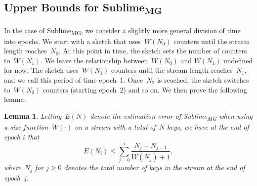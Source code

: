 \documentclass[sigconf]{acmart}
\newtheorem{lemma}[theorem]{Lemma}
\newcommand{\sketch}{Sublime}
\newcommand{\sketchmg}{\sketch\textsubscript{MG}\xspace}
\begin{document}
\subsection{Upper Bounds for \sketchmg}\label{sec:upper_bounds_mg_normal}
In the case of \sketchmg, we consider a slightly more general division of time
into epochs. We start with a sketch that uses~$W(N_0)$ counters until the
stream length reaches~$N_0$. At this point in time, the sketch sets the number
of counters to~$W(N_1)$. We leave the relationship between~$W(N_0)$ and
$W(N_1)$ undefined for now. The sketch uses~$W(N_1)$ counters until the stream
length reaches~$N_1$, and we call this period of time epoch~1. Once~$N_2$ is
reached, the sketch switches to~$W(N_2)$ counters (starting epoch~2) and so on.
We then prove the following lemma:

\begin{lemma}
    \label{lemma:mg-w}
    Letting~$E(N)$ denote the estimation error of \sketchmg when using a size
    function~$W(\cdot)$ on a stream with a total of~$N$ keys, we have at the
    end of epoch $i$ that
    $$ E(N_i) \leq \sum_{j=0}^i \frac{N_j - N_{j-1}}{W(N_j)+1},$$
    where~$N_{j}$ for $j\geq 0$ denotes the total number of keys in the stream
    at the end of epoch~$j$.
\end{lemma}
\end{document}
